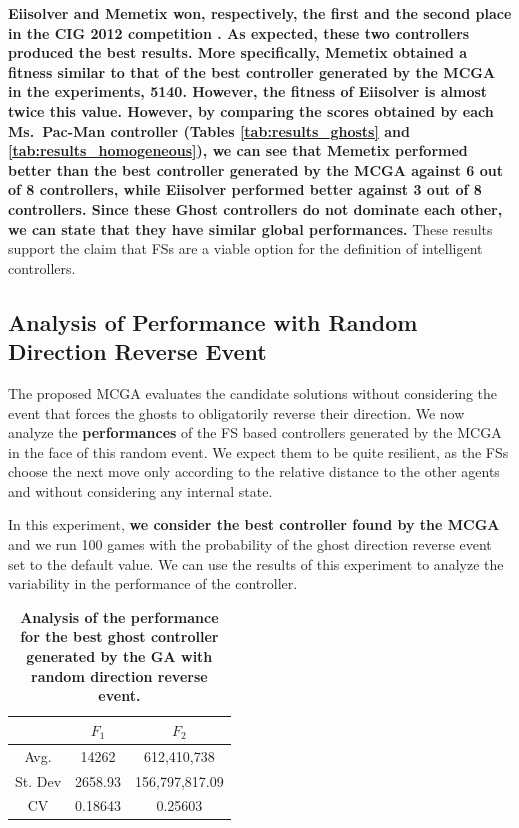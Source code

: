 \documentclass[journal]{IEEEtran}
\begin{document}
\textbf{Eiisolver and Memetix won, respectively, the first and the second place in the CIG 2012 competition \cite{CompetitionURL}. As expected, these two controllers produced the best results. More specifically, Memetix obtained a fitness similar to that of the best controller generated by the MCGA in the experiments, 5140. However, the fitness of Eiisolver is almost twice this value. However, by comparing the scores obtained by each Ms.\ Pac-Man controller (Tables \ref{tab:results_ghosts} and \ref{tab:results_homogeneous}), we can see that Memetix performed better than the best controller generated by the MCGA against 6 out of 8 controllers, while Eiisolver performed better against 3 out of 8 controllers. Since these Ghost controllers do not dominate each other, we can state that they have similar global performances.} These results support the claim that FSs are a viable option for the definition of intelligent controllers.

\subsection{\textbf{Analysis of Performance with Random Direction Reverse Event}}

The proposed MCGA evaluates the candidate solutions without considering the event that forces the ghosts to obligatorily reverse their direction. We now analyze the \textbf{performances} of the FS based controllers generated by the MCGA in the face of this random event. We expect them to be quite resilient, as the FSs choose the next move only according to the relative distance to the other agents and without considering any internal state.

In this experiment, \textbf{we consider the best controller found by the MCGA} and we run 100 games with the probability of the ghost direction reverse event set to the default value. We can use the results of this experiment to analyze the variability in the performance of the controller.

\begin{table}[!t]
\caption{\textbf{Analysis of the performance for the best ghost controller generated by the GA with random direction reverse event.}}
\label{tab:summary_robust}
\centering
\begin{tabular}{|c|c|c|}
\hline
 & $F_1$ & $F_2$ \\
\hline
Avg.	&	14262	&	612,410,738	\\
\hline
St. Dev	&	2658.93	&	156,797,817.09	\\
\hline
CV	&	0.18643	&	0.25603	\\
\hline
\end{tabular}
\end{table}
\end{document}
